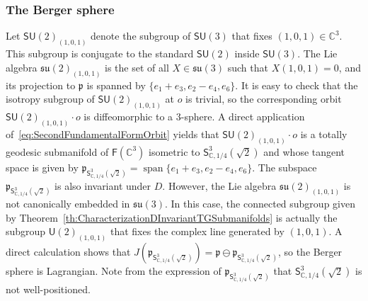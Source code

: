 \documentclass[11pt,a4paper,final]{amsart}
\newcommand{\s}{\mathsf}
\newcommand{\g}{\mathfrak}
\newcommand{\C}{\mathbb{C}}
\newcommand{\vecspan}{\operatorname{span}}
\theoremstyle{definition}
\begin{document}
\subsubsection{The Berger sphere \cite[Example~3.2]{Storm}}\label{ex:bergerflag}
Let $\mathsf{SU}(2)_{(1,0,1)}$ denote the subgroup of $\mathsf{SU}(3)$ that fixes $(1,0,1)\in \C^{3}$.
This subgroup is conjugate to the standard $\mathsf{SU}(2)$ inside $\mathsf{SU}(3)$.
The Lie algebra $\g{su}(2)_{(1,0,1)}$ is the set of all $X\in \g{su}(3)$ such that $X(1,0,1)=0$, and its projection to $\g{p}$ is
spanned by $\{e_{1}+e_{3},e_{2}-e_{4},e_{6}\}$.
It is easy to check that the isotropy subgroup of $\mathsf{SU}(2)_{(1,0,1)}$ at $o$ is trivial, so the corresponding orbit $\mathsf{SU}(2)_{(1,0,1)}\cdot o$ is diffeomorphic to a $3$-sphere.
A direct application of~\eqref{eq:SecondFundamentalFormOrbit} yields that $\mathsf{SU}(2)_{(1,0,1)}\cdot o$ is a totally geodesic submanifold of $\mathsf{F}(\C^{3})$ isometric to $\mathsf{S}^{3}_{\C,1/4}(\sqrt{2})$ and whose tangent space is given by $\g{p}_{\mathsf{S}^{3}_{\C,1/4}(\sqrt{2})}=\vecspan\{e_{1}+e_{3},e_{2}-e_{4},e_{6}\}$.
The subspace $\g{p}_{\mathsf{S}^{3}_{\C,1/4}(\sqrt{2})}$ is also invariant under $D$.
However, the Lie algebra $\g{su}(2)_{(1,0,1)}$ is not canonically embedded in $\g{su}(3)$.
In this case, the connected subgroup given by Theorem~\ref{th:CharacterizationDInvariantTGSubmanifolds} is actually the subgroup	$\s{U}(2)_{(1,0,1)}$ that fixes the complex line generated by $(1,0,1)$.
A direct calculation shows that $J(\g{p}_{\mathsf{S}^{3}_{\C,1/4}(\sqrt{2})})=\g{p}\ominus \g{p}_{\mathsf{S}^{3}_{\C,1/4}(\sqrt{2})}$, so the Berger sphere is Lagrangian.
Note from the expression of $\g{p}_{\mathsf{S}^{3}_{\C,1/4}(\sqrt{2})}$ that $\mathsf{S}^{3}_{\C,1/4}(\sqrt{2})$ is not well-positioned.
	
\end{document}
